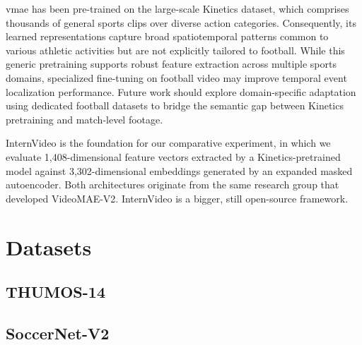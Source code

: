 \acrlong{vmae} has been pre-trained on the large-scale Kinetics dataset, which comprises thousands of general sports clips over diverse action categories. Consequently, its learned representations capture broad spatiotemporal patterns common to various athletic activities but are not explicitly tailored to football. While this generic pretraining supports robust feature extraction across multiple sports domains, specialized fine-tuning on football video may improve temporal event localization performance. Future work should explore domain-specific adaptation using dedicated football datasets to bridge the semantic gap between Kinetics pretraining and match-level footage. 

InternVideo is the foundation for our comparative experiment, in which we evaluate 1,408-dimensional feature vectors extracted by a Kinetics-pretrained model against 3,302-dimensional embeddings generated by an expanded masked autoencoder. Both architectures originate from the same research group that developed VideoMAE-V2. InternVideo is a bigger, still open-source framework.


\section{Datasets}
\label{sec:method_datasets}

\subsection{THUMOS-14}

\subsection{SoccerNet-V2}

